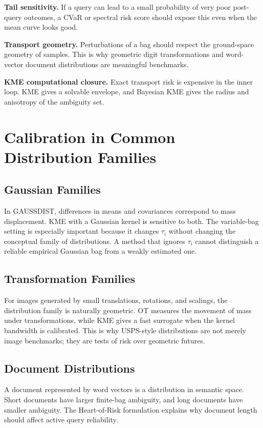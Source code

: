 \documentclass[10pt,journal]{IEEEtran}
\begin{document}
\textbf{Tail sensitivity.} If a query can lead to a small probability of very poor post-query outcomes, a CVaR or spectral risk score should expose this even when the mean curve looks good.

\textbf{Transport geometry.} Perturbations of a bag should respect the ground-space geometry of samples. This is why geometric digit transformations and word-vector document distributions are meaningful benchmarks.

\textbf{KME computational closure.} Exact transport risk is expensive in the inner loop. KME gives a solvable envelope, and Bayesian KME gives the radius and anisotropy of the ambiguity set.

\section{Calibration in Common Distribution Families}
\label{sec:families-v5}

\subsection{Gaussian Families}

In GAUSSDIST, differences in means and covariances correspond to mass displacement. KME with a Gaussian kernel is sensitive to both. The variable-bag setting is especially important because it changes $\tau_i$ without changing the conceptual family of distributions. A method that ignores $\tau_i$ cannot distinguish a reliable empirical Gaussian bag from a weakly estimated one.

\subsection{Transformation Families}

For images generated by small translations, rotations, and scalings, the distribution family is naturally geometric. OT measures the movement of mass under transformations, while KME gives a fast surrogate when the kernel bandwidth is calibrated. This is why USPS-style distributions are not merely image benchmarks; they are tests of risk over geometric futures.

\subsection{Document Distributions}

A document represented by word vectors is a distribution in semantic space. Short documents have larger finite-bag ambiguity, and long documents have smaller ambiguity. The Heart-of-Risk formulation explains why document length should affect active query reliability.
\end{document}
